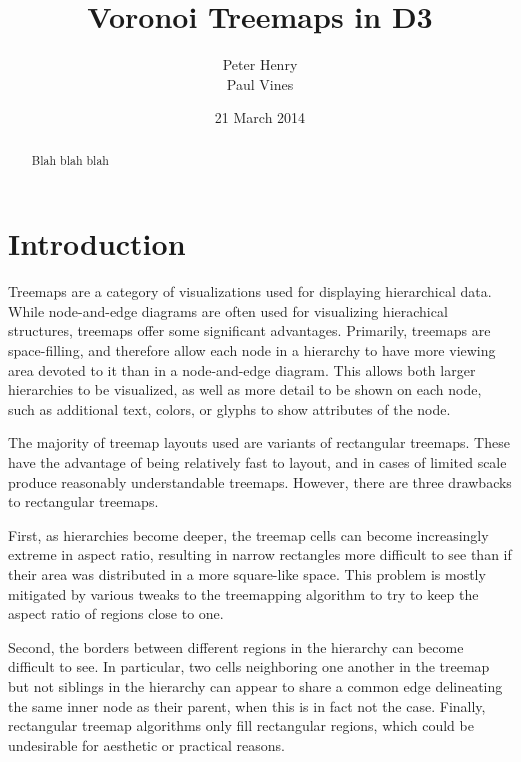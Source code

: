\documentclass{acm_proc_article-sp}
\begin{document}
\title{Voronoi Treemaps in D3}

 \author{ \alignauthor Peter Henry
  \\ 
  \alignauthor Paul Vines \\  } \date{21 March
  2014}

\maketitle
\begin{abstract}
Blah blah blah
\end{abstract}


\section{Introduction}
\label{sec:introduction}
Treemaps are a category of visualizations used for displaying
hierarchical data. While node-and-edge diagrams are often used for
visualizing hierachical structures, treemaps offer some significant
advantages. Primarily, treemaps are space-filling, and therefore allow
each node in a hierarchy to have more viewing area devoted to it than
in a node-and-edge diagram. This allows both larger hierarchies to be
visualized, as well as more detail to be shown on each node, such as
additional text, colors, or glyphs to show attributes of the node.

The majority of treemap layouts used are variants of rectangular
treemaps. These have the advantage of being relatively fast to layout,
and in cases of limited scale produce reasonably understandable
treemaps. However, there are three drawbacks to rectangular treemaps.

First, as hierarchies become deeper, the treemap cells can become
increasingly extreme in aspect ratio, resulting in narrow rectangles
more difficult to see than if their area was distributed in a more
square-like space. This problem is mostly mitigated by various tweaks
to the treemapping algorithm to try to keep the aspect ratio of
regions close to one.

Second, the borders between different regions in the hierarchy can
become difficult to see. In particular, two cells neighboring one
another in the treemap but not siblings in the hierarchy can appear to
share a common edge delineating the same inner node as their parent,
when this is in fact not the case.  Finally, rectangular treemap
algorithms only fill rectangular regions, which could be
undesirable for aesthetic or practical reasons.
\end{document}
